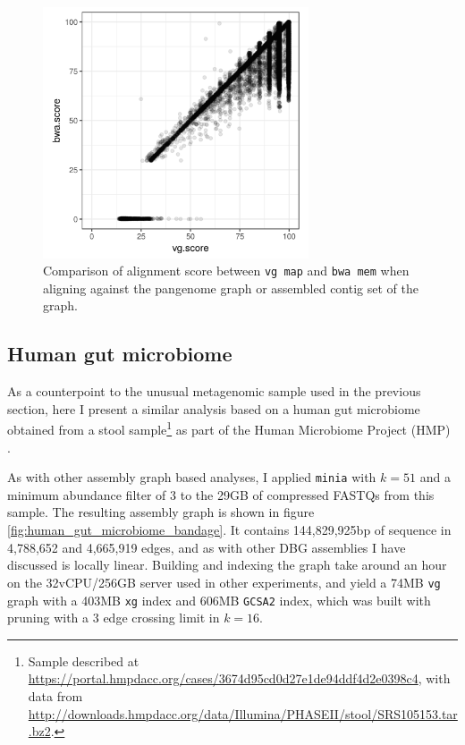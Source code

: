 \begin{figure}[htbp!]
  \centering
  \includegraphics[width=0.7\textwidth]{Chapter3/Figs/ERR414817_holdout_bwa_vs_vg_k51_m3.png}
  \caption[Comparing {\tt vg} and {\tt bwa} alignment to the viral metagenome]{
    Comparison of alignment score between {\tt vg map} and {\tt bwa mem} when aligning against the pangenome graph or assembled contig set of the graph.
  }
  \label{fig:viral_metagenome_scatter}
\end{figure}

\subsection{Human gut microbiome}

As a counterpoint to the unusual metagenomic sample used in the previous section, here I present a similar analysis based on a human gut microbiome obtained from a stool sample\footnote{Sample described at \url{https://portal.hmpdacc.org/cases/3674d95cd0d27e1de94ddf4d2e0398c4}, with data from \url{http://downloads.hmpdacc.org/data/Illumina/PHASEII/stool/SRS105153.tar.bz2}.} as part of the Human Microbiome Project (HMP) \cite{turnbaugh2007human,peterson2009nih}.

As with other assembly graph based analyses, I applied {\tt minia} with $k=51$ and a minimum abundance filter of 3 to the 29GB of compressed FASTQs from this sample.
The resulting assembly graph is shown in figure \ref{fig:human_gut_microbiome_bandage}.
It contains 144,829,925bp of sequence in 4,788,652 and 4,665,919 edges, and as with other DBG assemblies I have discussed is locally linear.
Building and indexing the graph take around an hour on the 32vCPU/256GB server used in other experiments, and yield a 74MB {\tt vg} graph with a 403MB {\tt xg} index and 606MB {\tt GCSA2} index, which was built with pruning with a 3 edge crossing limit in $k=16$.

